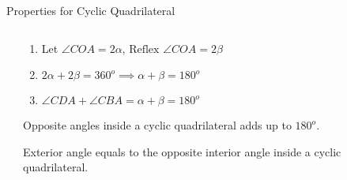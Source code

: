 \documentclass{beamer}
\begin{document}
\begin{frame}{Properties for Cyclic Quadrilateral}
	\begin{columns}
		\begin{center}
			\begin{minipage}{0.9\textwidth}
				\begin{center}
				\end{center}
			\end{minipage}	
		\end{center}
		\begin{center}
			\begin{minipage}{0.9\textwidth}
				\begin{enumerate}
					\item Let $\angle COA = 2\alpha$, $\text{Reflex } \angle COA = 2\beta$
					\pause
					\item $2\alpha + 2\beta = 360^o \implies \alpha + \beta = 180^o$
					\pause
					\item $\angle CDA + \angle CBA = \alpha + \beta = 180^o$
					\pause
				\end{enumerate}
				\begin{theorem}
					Opposite angles inside a cyclic quadrilateral adds up to $180^o$.
				\end{theorem}
				\begin{Corollary}
					Exterior angle equals to the opposite interior angle inside a cyclic quadrilateral.
				\end{Corollary}
			\end{minipage}
		\end{center}
	\end{columns}
\end{frame}
\end{document}
